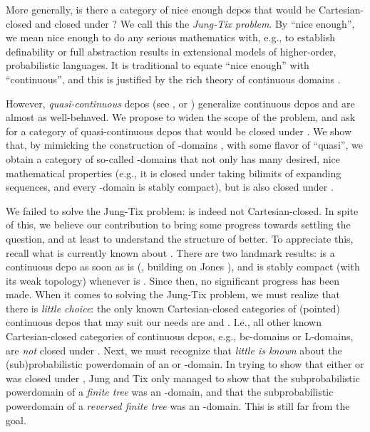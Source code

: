 \documentclass{LMCS}
\begin{document}
More generally, is there a category of nice enough dcpos that would be
Cartesian-closed and closed under ?  We call this the {\em
  Jung-Tix problem\/}.  By ``nice enough'', we mean nice enough to do
any serious mathematics with, e.g., to establish definability or full
abstraction results in extensional models of higher-order,
probabilistic languages.  It is traditional to equate ``nice enough''
with ``continuous'', and this is justified by the rich theory of
continuous domains \cite{GHKLMS:contlatt}.

However, {\em quasi-continuous\/} dcpos (see \cite{GLS:quasicont}, or
\cite[III-3]{GHKLMS:contlatt}) generalize continuous dcpos and are
almost as well-behaved.  We propose to widen the scope of the problem,
and ask for a category of quasi-continuous dcpos that would be closed
under .  We show that, by mimicking the construction of
-domains \cite{AJ:domains},
with some flavor of ``quasi'', we obtain a category  of
so-called -domains that not only has many desired, nice
mathematical properties (e.g., it is closed under taking bilimits of
expanding sequences, and every -domain is stably compact),
but is also closed under .

We failed to solve the Jung-Tix problem:  is indeed not
Cartesian-closed.  In spite of this, we believe our contribution to
bring some progress towards settling the question, and at least to
understand the structure of  better.  To appreciate this,
recall what is currently known about .  There are two landmark
results:  is a continuous dcpo as soon as  is
(\cite{Edalat:int}, building on Jones
\cite{JP:proba}), and  is stably compact (with its weak
topology) whenever  is \cite{JT:troublesome,AMJK:scs:prob}.  Since
then, no significant progress has been made.  When it comes to solving
the Jung-Tix problem, we must realize that there is {\em little
  choice\/}: the only known Cartesian-closed categories of (pointed)
continuous dcpos that may suit our needs are  and 
\cite{JT:troublesome}.  I.e., all other known Cartesian-closed
categories of continuous dcpos, e.g., bc-domains or L-domains, are
{\em not\/} closed under .
Next, we must recognize that {\em little is known\/} about the
(sub)probabilistic powerdomain of an  or -domain.  In trying
to show that either  or  was closed under , Jung and
Tix \cite{JT:troublesome} only managed to show that the
subprobabilistic powerdomain  of a {\em finite
  tree\/}  was an -domain, and that the subprobabilistic
powerdomain of a {\em reversed finite tree\/} was an -domain.
This is still far from the goal.
\end{document}
